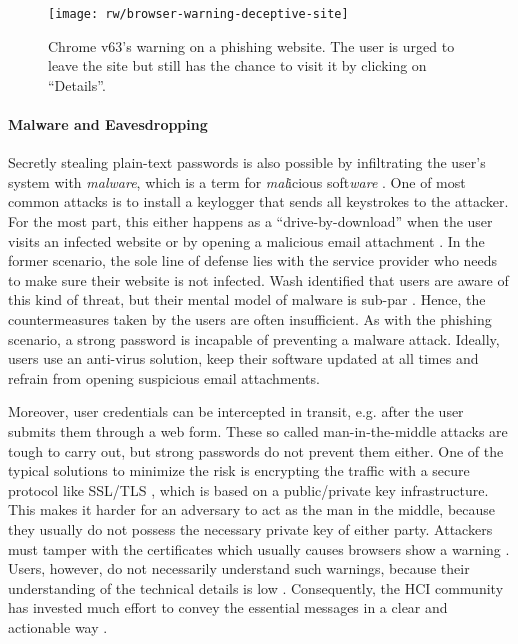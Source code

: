 \begin{figure}
	\centering
	\texttt{[image: rw/browser-warning-deceptive-site]}
	\caption{\label{fig:rw:browser_warning}Chrome v63's warning on a phishing website. The user is urged to leave the site but still has the chance to visit it by clicking on ``Details''.}
\end{figure}

\paragraph{Malware and Eavesdropping} 
Secretly stealing plain-text passwords is also possible by infiltrating the user's system with \textit{malware}, which is a term for \textit{mal}icious soft\textit{ware} \cite{Bayer2009CurrentMalware}. One of most common attacks is to install a keylogger that sends all keystrokes to the attacker. For the most part, this either happens as a ``drive-by-download'' when the user visits an infected website or by opening a malicious email attachment \cite{BKA2016Bundeslagebild}. In the former scenario, the sole line of defense lies with the service provider who needs to make sure their website is not infected.
Wash identified that users are aware of this kind of threat, but their mental model of malware is sub-par \cite{Wash2010FolkModels}. Hence, the countermeasures taken by the users are often insufficient. As with the phishing scenario, a strong password is incapable of preventing a malware attack. Ideally, users use an anti-virus solution, keep their software updated at all times and refrain from opening suspicious email attachments. 

Moreover, user credentials can be intercepted in transit, e.g. after the user submits them through a web form. These so called man-in-the-middle attacks are tough to carry out, but strong passwords do not prevent them either. 
One of the typical solutions to minimize the risk is encrypting the traffic with a secure protocol like SSL/TLS \cite[p. 853ff.]{Tanenbaum2011ComputerNetworks}, which is based on a public/private key infrastructure. This makes it harder for an adversary to act as the man in the middle, because they usually do not possess the necessary private key of either party. Attackers must tamper with the certificates which usually causes browsers show a warning \cite{Maurer2011ShiningChrome}. 
Users, however, do not necessarily understand such warnings, because their understanding of the technical details is low \cite{Herley2009SoLongThanksExternalities, Whitten1999WhyJohnnyCantEncrypt}. Consequently, the HCI community has invested much effort to convey the essential messages in a clear and actionable way \cite{Felt2015ImprovingSSLWarnings, Felt2014ChromeSSL,  Maurer2011ShiningChrome, Sotirakopoulos2011ReplicationSSLWarnings, Sunshine2009CryingWolf}.

